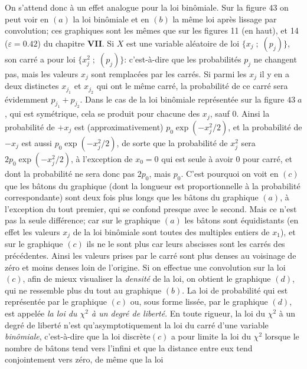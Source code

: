 On s'attend donc \`a un effet analogue pour la loi bin\^omiale. Sur la
figure $43$ on peut voir en $(a)$ la loi bin\^omiale et en $(b)$ la m\^eme 
loi apr\`es lissage par convolution; ces graphiques sont les m\^emes que 
sur les figures 11 (en haut), et 14 ($\varepsilon = 0.42$) du chapitre {\bf
VII}. Si $X$ est une variable al\'eatoire de loi $\{ x_j\; ; \; (p_j) \}$, son
carr\'e a pour loi $\{ x_j^2\; ; \; (p_j)\}$: c'est-\`a-dire que les
probabilit\'es $p_j$ ne changent pas, mais les valeurs $x_j$ sont
remplac\'ees par les carr\'es. Si parmi les $x_j$ il y en a deux distinctes
$x_{j_1}$ et $x_{j_2}$ qui ont le m\^eme carr\'e, la probabilit\'e de ce
carr\'e sera \'evidemment $p_{j_1} + p_{j_2}$.
Dans le cas de la loi bin\^omiale repr\'esent\'ee
sur la figure $43\; a$, qui est sym\'etrique,  cela se produit pour 
chacune des $x_j$, sauf $0$. Ainsi la probabilit\'e de $+x_j$ est
(approximativement) $p_0\exp (- x_j^2/2)$, et la probabilit\'e de $-x_j$
est aussi $p_0\exp (- x_j^2/2)$, de sorte que la probabilit\'e de $x_j^2$
sera $2p_0 \exp (- x_j^2/2)$, \`a l'exception de $x_0 = 0$ qui est seule 
\`a avoir $0$ pour carr\'e, et dont la probabilit\'e ne sera donc pas $2p_0$,
mais $p_0$. C'est pourquoi on voit en $(c)$ que les b\^atons du graphique
(dont la longueur est proportionnelle \`a la probabilit\'e correspondante)
sont deux fois plus longs que les b\^atons du graphique $(a)$, \`a
l'exception du tout premier,  qui se confond presque avec le second. 
Mais ce n'est pas la seule diff\'erence;  car sur
le graphique $(a)$ les b\^atons sont \'equidistants (en effet les valeurs
$x_j$ de la loi bin\^omiale sont toutes des multiples entiers de $x_1$), et
sur le graphique $(c)$ ils ne le sont plus car leurs abscisses sont les
carr\'es des pr\'ec\'edentes. Ainsi les valeurs prises par le carr\'e sont
plus denses au voisinage de z\'ero et moins denses loin de l'origine. Si on
effectue une convolution sur la loi $(c)$, afin de mieux visualiser la {\it
densit\'e} de la loi, on obtient le graphique $(d)$, qui ne ressemble plus 
du tout au graphique $(b)$. 
\medskip
La loi de probabilit\'e qui est repr\'esent\'ee par le graphique $(c)$ ou, 
sous forme liss\'ee, par le graphique $(d)$, est appel\'ee {\it la loi du
$\chi^2$ \`a un degr\'e de libert\'e}. En toute rigueur, la loi du $\chi^2$ 
\`a un degr\'e de libert\'e n'est qu'asymptotiquement la loi du carr\'e
d'une variable {\it bin\^omiale}, 
c'est-\`a-dire que la loi discr\`ete$(c)$ a pour limite la loi du $\chi^2$ lorsque le nombre de b\^atons tend
vers l'infini et que la
distance entre eux tend conjointement vers z\'ero, de m\^eme que la loi
